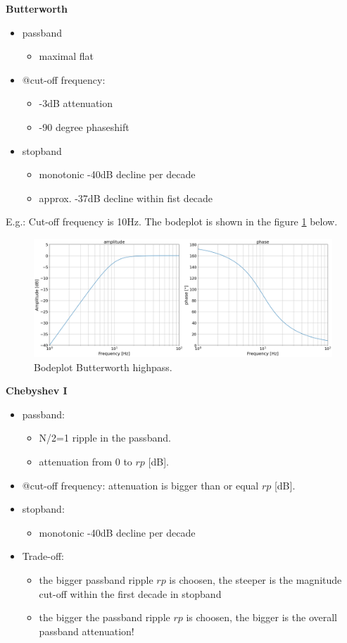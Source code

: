 
\textbf{Butterworth}
\begin{itemize}
    \item passband
    \begin{itemize}
        \item maximal flat
    \end{itemize}
    \item @cut-off frequency:
    \begin{itemize}
        \item -3dB attenuation
        \item -90 degree phaseshift
    \end{itemize}
    \item stopband 
    \begin{itemize}
        \item monotonic -40dB decline per decade
        \item approx. -37dB decline within fist decade
    \end{itemize} 
\end{itemize}

E.g.: Cut-off frequency is 10Hz. The bodeplot is shown in the figure \ref{fig:hp_butter} below.
\begin{figure}[h!]
  \centering
  \includegraphics[width=.75\linewidth]{hp_butter.png}
  \caption{Bodeplot Butterworth highpass.}
  \label{fig:hp_butter}
\end{figure}
	
\textbf{Chebyshev I}\\
\begin{itemize}
    \item passband:
    \begin{itemize}
        \item N/2=1 ripple in the passband.
        \item attenuation from 0 to $rp$ [dB].
    \end{itemize}
    \item @cut-off frequency: attenuation is bigger than or equal $rp$ [dB].
    \item stopband:
    \begin{itemize}
        \item monotonic -40dB decline per decade
    \end{itemize}
    \item Trade-off:
    \begin{itemize}
        \item the bigger passband ripple $rp$ is choosen, the steeper is the magnitude cut-off within the first decade in stopband 
        \item the bigger the passband ripple $rp$ is choosen, the bigger is the overall passband attenuation!
    \end{itemize}
\end{itemize}

